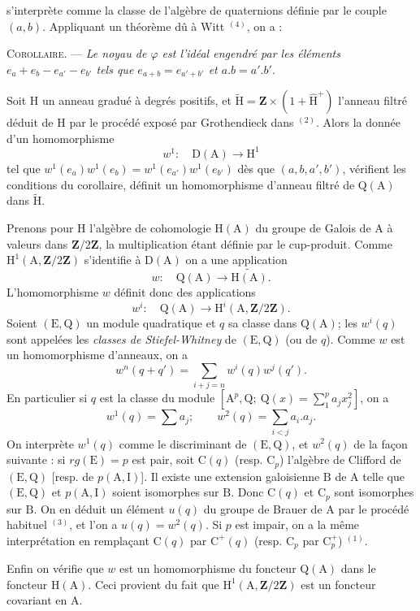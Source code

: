 s'interprète comme la classe de l'algèbre de quaternions définie par le
couple $(a,b)$. Appliquant un théorème dû à Witt $^{(4)}$, on a :

\textsc{Corollaire.} --- \textit{Le noyau de $\varphi$ est l'idéal engendré par les
éléments $e_a+e_b-e_{a'}-e_{b'}$ tels que $e_{a+b}=e_{a'+b'}$ et $a.b=a'.b'$.}

Soit $\mathrm H$ un anneau gradué à degrés positifs, et
$\widetilde{\mathrm H}=\mathbf Z\times(1+\widehat{\mathrm H}^{+})$
l'anneau filtré déduit de $\mathrm H$ par le procédé exposé par Grothendieck
dans $^{(2)}$. Alors la donnée d'un homomorphisme
\[
w^1:\quad\mathrm D(\mathrm A)\to\mathrm H^1
\]
tel que $w^1(e_a)w^1(e_b)=w^1(e_{a'})w^1(e_{b'})$ dès que
$(a,b,a',b')$, vérifient les conditions du corollaire, définit un homomorphisme
d'anneau filtré de $\mathrm Q(\mathrm A)$ dans $\widetilde{\mathrm H}$.

Prenons pour $\mathrm H$ l'algèbre de cohomologie $\mathrm H(\mathrm A)$ du groupe de Galois
de $\mathrm A$ à valeurs dans $\mathbf Z/2\mathbf Z$, la multiplication étant définie par le
cup-produit. Comme $\mathrm H^1(\mathrm A,\mathbf Z/2\mathbf Z)$ s'identifie à
$\mathrm D(\mathrm A)$ on a une application
\[
w:\quad\mathrm Q(\mathrm A)\to\widetilde{\mathrm H(\mathrm A)}.
\]
L'homomorphisme $w$ définit donc des applications
\[
w^i:\quad\mathrm Q(\mathrm A)\to\mathrm H^i(\mathrm A,\mathbf Z/2\mathbf Z).
\]
Soient $(\mathrm E,\mathrm Q)$ un module quadratique et $q$ sa classe dans
$\mathrm Q(\mathrm A)$; les $w^i(q)$ sont appelées les \textit{classes de
Stiefel-Whitney} de $(\mathrm E,\mathrm Q)$ (ou de $q$).
Comme $w$ est un homomorphisme d'anneaux, on a
\[
w^n(q+q')=\sum_{i+j=n}w^i(q)w^j(q').
\]
En particulier si $q$ est la classe du module
$\left[\mathrm A^p,\mathrm Q;\ \mathrm Q(x)=\sum_1^p a_jx_j^2\right]$, on a
\[
w^1(q)=\sum a_j;\qquad w^2(q)=\sum_{i<j}a_i.a_j.
\]
On interprète $w^1(q)$ comme le discriminant de $(\mathrm E,\mathrm Q)$,
et $w^2(q)$ de la façon suivante : si $rg(\mathrm E)=p$ est pair,
soit $\mathrm C(q)$ (resp. $\mathrm C_p$) l'algèbre de Clifford de
$(\mathrm E,\mathrm Q)$ [resp. de $p(\mathrm A,\mathrm I)$].
Il existe une extension galoisienne $\mathrm B$ de $\mathrm A$ telle que
$(\mathrm E,\mathrm Q)$ et $p(\mathrm A,\mathrm I)$ soient isomorphes sur $\mathrm B$.
Donc $\mathrm C(q)$ et $\mathrm C_p$ sont isomorphes sur $\mathrm B$.
On en déduit un élément $u(q)$ du groupe de Brauer de $\mathrm A$ par le procédé
habituel $^{(3)}$, et l'on a $u(q)=w^2(q)$. Si $p$ est impair, on a la même
interprétation en remplaçant $\mathrm C(q)$ par $\mathrm C^+(q)$
(resp. $\mathrm C_p$ par $\mathrm C_p^+$) $^{(1)}$.

Enfin on vérifie que $w$ est un homomorphisme du foncteur $\mathrm Q(\mathrm A)$
dans le foncteur $\mathrm H(\mathrm A)$. Ceci provient du fait que
$\mathrm H^1(\mathrm A,\mathbf Z/2\mathbf Z)$ est un foncteur covariant en $\mathrm A$.
